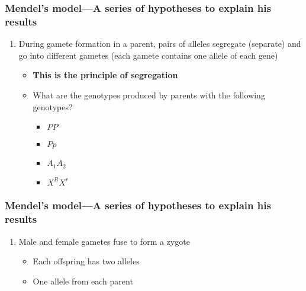 \begin{frame}
\begin{description}
\begin{frame}
\end{frame}

\begin{frame}
    \frametitle{Mendel's model---A series of hypotheses to explain his results}
    \begin{enumerate}[<+->]
        \item During gamete formation in a parent, pairs of alleles segregate
            (separate) and go into different gametes (each gamete contains one
            allele of each gene)
            \begin{itemize}
                \item \textbf{This is the principle of segregation}
                \item What are the  genotypes produced
                    by parents with the following genotypes?
                    \begin{itemize}
                        \item $PP$ 
                        \item $Pp$ 
                        \item $A_{1}A_{2}$ 
                        \item $X^{R}X^{r}$ 
                    \end{itemize}
            \end{itemize}
    \end{enumerate}
\end{frame}

\begin{frame}
    \frametitle{Mendel's model---A series of hypotheses to explain his results}
    \begin{enumerate}[<+->]
        \item Male and female gametes fuse to form a zygote
            \begin{itemize}
                \item Each offspring has two alleles
                \item One allele from each parent
            \end{itemize}
    \end{enumerate}
\end{frame}


\end{description}
\end{frame}
